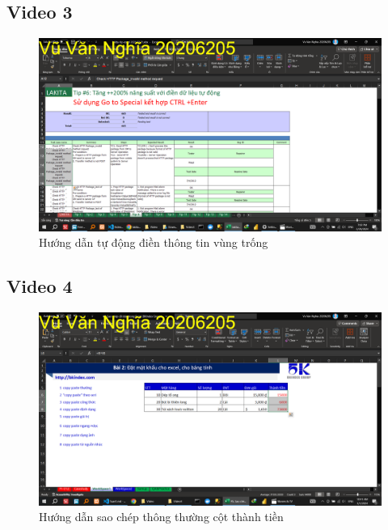 \documentclass{article}
\begin{document}
\subsection{Video 3}
\begin{figure}[H]
\centering
\includegraphics[scale = 0.15]{Video3/HuongDan/1.png}
\caption{Hướng dẫn tự động điền thông tin vùng trống}
\end{figure}
\subsection{Video 4}
\begin{figure}[H]
\centering
\includegraphics[scale = 0.15]{Video4/HuongDan/0.png}
\caption{Hướng dẫn sao chép thông thường cột thành tiền}
\end{figure}
\end{document}

